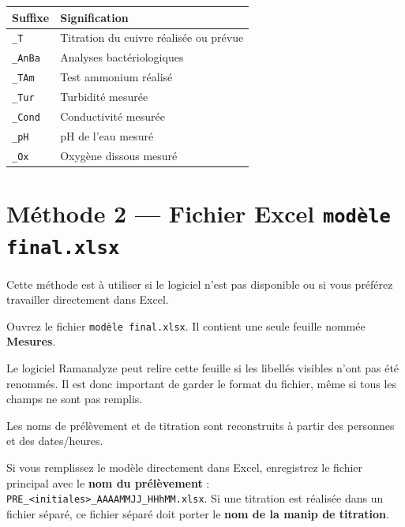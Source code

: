 \documentclass[12pt, a4paper]{article}
\begin{document}
\begin{center}
\begin{tabularx}{0.72\linewidth}{C{1.6cm} L{8cm}}
  \toprule
  \textbf{Suffixe} & \textbf{Signification} \\
  \midrule
  \texttt{\_T} & Titration du cuivre réalisée ou prévue \\
  \texttt{\_AnBa} & Analyses bactériologiques \\
  \texttt{\_TAm} & Test ammonium réalisé \\
  \texttt{\_Tur} & Turbidité mesurée \\
  \texttt{\_Cond} & Conductivité mesurée \\
  \texttt{\_pH} & pH de l'eau mesuré \\
  \texttt{\_Ox} & Oxygène dissous mesuré \\
  \bottomrule
\end{tabularx}
\end{center}

\newpage

\section{Méthode 2 — Fichier Excel \texttt{modèle final.xlsx}}

Cette méthode est à utiliser si le logiciel n'est pas disponible ou
si vous préférez travailler directement dans Excel.

Ouvrez le fichier \texttt{modèle final.xlsx}. Il contient une seule
feuille nommée \textbf{Mesures}.

Le logiciel Ramanalyze peut relire cette feuille si les libellés visibles
n'ont pas été renommés. Il est donc important de garder le format du
fichier, même si tous les champs ne sont pas remplis.

Les noms de prélèvement et de titration sont reconstruits à partir des
personnes et des dates/heures.

\begin{important}
  Si vous remplissez le modèle directement dans Excel, enregistrez le
  fichier principal avec le \textbf{nom du prélèvement} :
  \texttt{PRE\_<initiales>\_AAAAMMJJ\_HHhMM.xlsx}. Si une titration
  est réalisée dans un fichier séparé, ce fichier séparé doit porter
  le \textbf{nom de la manip de titration}.
\end{important}
\end{document}
